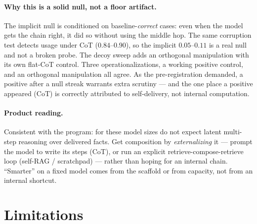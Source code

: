 \documentclass[11pt]{article}
\begin{document}
\paragraph{Why this is a solid null, not a floor artifact.}
The implicit null is conditioned on baseline-\emph{correct} cases: even when the model
gets the chain right, it did so without using the middle hop. The same corruption test
detects usage under CoT ($0.84$--$0.90$), so the implicit $0.05$--$0.11$ is a real
null and not a broken probe. The decoy sweep adds an orthogonal manipulation with its
own flat-CoT control. Three operationalizations, a working positive control, and an
orthogonal manipulation all agree. As the pre-registration demanded, a positive after
a null streak warrants extra scrutiny --- and the one place a positive appeared (CoT)
is correctly attributed to self-delivery, not internal computation.

\paragraph{Product reading.}
Consistent with the program: for these model sizes do not expect latent multi-step
reasoning over delivered facts. Get composition by \emph{externalizing} it --- prompt
the model to write its steps (CoT), or run an explicit retrieve-compose-retrieve loop
(self-RAG / scratchpad) --- rather than hoping for an internal chain. ``Smarter'' on a
fixed model comes from the scaffold or from capacity, not from an internal shortcut.

\section{Limitations}
\label{sec:limits}
\end{document}
